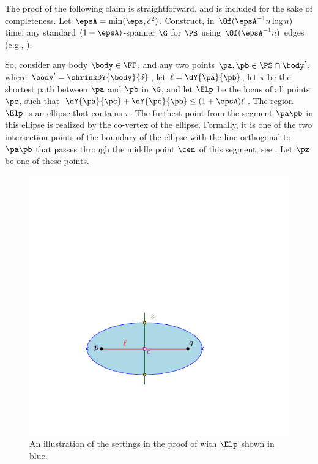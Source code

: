             The proof of the following claim is straightforward, and is
        included for the sake of completeness.  Let
        $\epsA = \min( \eps, \delta^2)$. Construct, in
        $\Of(\epsA^{-1} n \log n)$ time, any standard $(1+\epsA)$-spanner
        $\G$ for $\PS$ using $\Of( \epsA^{-1} n)$ edges (e.g.,
        \cite{ams-dagss-99}).
        
        So, consider any body $\body \in \FF$, and any two points
        $\pa, \pb \in \PS \cap \body'$, where
        $\body'=\shrinkDY{\body}{\delta}$, let $\ell = \dY{\pa}{\pb}$, let
        $\pi$ be the shortest path between $\pa$ and $\pb$ in $\G$, and
        let $\Elp$ be the locus of all points $\pc$, such that
        $\dY{\pa}{\pc} + \dY{\pc}{\pb} \leq (1+\epsA) \ell$. The region
        $\Elp$ is an ellipse that contains $\pi$. The furthest point from
        the segment $\pa\pb$ in this ellipse is realized by the co-vertex
        of the ellipse. Formally, it is one of the two intersection points
        of the boundary of the ellipse with the line orthogonal to
        $\pa \pb$ that passes through the middle point $\cen$ of this
        segment, see . Let $\pz$ be one of these points.
        
        \begin{figure}[h]
                \centerline{\includegraphics{../figs/ellipse}}
                \caption{An illustration of the settings in the proof of
                         with $\Elp$ shown in blue.}
        \end{figure}
        
